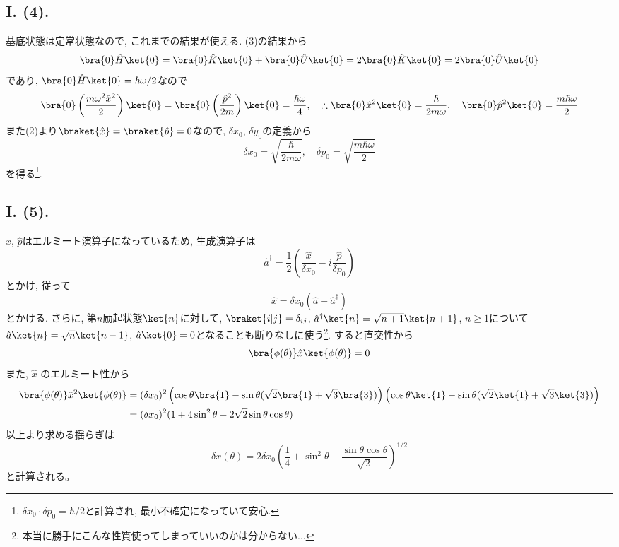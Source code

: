 \subsection*{I. (4). }
基底状態は定常状態なので, これまでの結果が使える. 
(3)の結果から
\begin{equation}
  \bra{0}\hat{H}\ket{0}=\bra{0}\hat{K}\ket{0}+\bra{0}\hat{U}\ket{0}=2\bra{0}\hat{K}\ket{0}=2\bra{0}\hat{U}\ket{0}
\end{equation}
であり, $\bra{0}\hat{H}\ket{0}=\hbar\omega/2$なので
\begin{equation}
  \bra{0}\left( \frac{m\omega^2\hat{x}^2}{2} \right)\ket{0}=\bra{0}\left( \frac{\hat{p}^2}{2m} \right)\ket{0}=\frac{\hbar\omega}{4}, \quad\therefore \bra{0}\hat{x}^2\ket{0}=\frac{\hbar}{2m\omega}, \quad \bra{0}\hat{p}^2\ket{0}=\frac{m\hbar\omega}{2}
\end{equation}
また(2)より$\braket{\hat{x}}=\braket{\hat{p}}=0$なので, $\delta x_0$, $\delta y_0$の定義から
\begin{equation}
  \delta x_0=\sqrt{\frac{\hbar}{2m\omega}}, \quad \delta p_0=\sqrt{\frac{m\hbar\omega}{2}}
\end{equation}
を得る\footnote{$\delta x_0\cdot\delta p_0=\hbar/2$と計算され, 最小不確定になっていて安心. }. 

\subsection*{I. (5).}
$\hat{x}$, $\hat{p}$はエルミート演算子になっているため, 生成演算子は
\begin{equation}
  \hat{a}^\dag=\frac{1}{2}\left( \frac{\hat{x}}{\delta x_0}-i\frac{\hat{p}}{\delta p_0} \right)
\end{equation}
とかけ, 従って
\begin{equation}
  \hat{x}=\delta x_0(\hat{a}+\hat{a}^\dag)
\end{equation}
とかける. 
さらに, 第$n$励起状態$\ket{n}$に対して, $\braket{i|j}=\delta_{ij}$, $\hat{a}^\dag\ket{n}=\sqrt{n+1}\ket{n+1}$, $n\geq 1$について$\hat{a}\ket{n}=\sqrt{n}\ket{n-1}$, $\hat{a}\ket{0}=0$となることも断りなしに使う\footnote{本当に勝手にこんな性質使ってしまっていいのかは分からない...}.
すると直交性から
\begin{equation}
  \bra{\phi(\theta)}\hat{x}\ket{\phi(\theta)}=0
\end{equation}
また, $\hat{x}$ のエルミート性から
\begin{align*}
  \bra{\phi(\theta)}\hat{x}^2\ket{\phi(\theta)}&=(\delta x_0)^2\left( \cos\theta\bra{1}-\sin\theta(\sqrt{2}\bra{1}+\sqrt{3}\bra{3}) \right)\left( \cos\theta\ket{1}-\sin\theta(\sqrt{2}\ket{1}+\sqrt{3}\ket{3}) \right)\\
  &=(\delta x_0)^2(1+4\sin^2\theta-2\sqrt{2}\sin\theta\cos\theta)
\end{align*}
以上より求める揺らぎは
\begin{equation}
  \delta x(\theta)=2\delta x_0 \left( \frac{1}{4}+\sin^2\theta-\frac{\sin\theta\cos\theta}{\sqrt{2}} \right)^{1/2}
\end{equation}
と計算される。 

